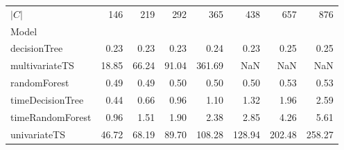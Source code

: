 \begin{tabular}{lrrrrrrr}
\toprule
$|C|$ & 146 & 219 & 292 & 365 & 438 & 657 & 876 \\
Model &  &  &  &  &  &  &  \\
\midrule
decisionTree & 0.23 & 0.23 & 0.23 & 0.24 & 0.23 & 0.25 & 0.25 \\
multivariateTS & 18.85 & 66.24 & 91.04 & 361.69 & NaN & NaN & NaN \\
randomForest & 0.49 & 0.49 & 0.50 & 0.50 & 0.50 & 0.53 & 0.53 \\
timeDecisionTree & 0.44 & 0.66 & 0.96 & 1.10 & 1.32 & 1.96 & 2.59 \\
timeRandomForest & 0.96 & 1.51 & 1.90 & 2.38 & 2.85 & 4.26 & 5.61 \\
univariateTS & 46.72 & 68.19 & 89.70 & 108.28 & 128.94 & 202.48 & 258.27 \\
\bottomrule
\end{tabular}
